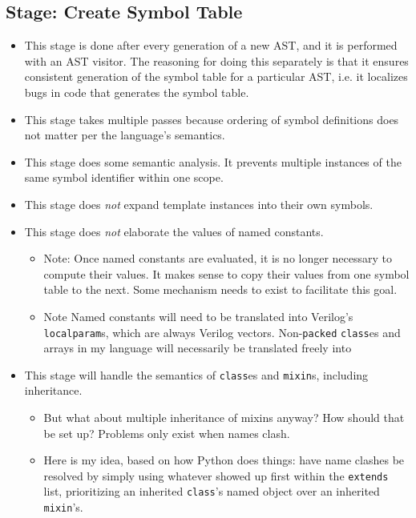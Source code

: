 \documentclass{article}
\begin{document}
	\subsection{Stage:  Create Symbol Table }
		\begin{itemize}
		\item This stage is done after every generation of a new AST, and
			it is performed with an AST visitor.  The reasoning for doing
			this separately is that it ensures consistent generation of the
			symbol table for a particular AST, i.e. it localizes bugs in
			code that generates the symbol table.
		\item This stage takes multiple passes because ordering of symbol
			definitions does not matter per the language's semantics.
		\item This stage does some semantic analysis.  It prevents multiple
			instances of the same symbol identifier within one scope.
		\item This stage does \textit{not} expand template instances into
			their own symbols.
		\item This stage does \textit{not} elaborate the values of named
			constants.
			\begin{itemize}
			\item Note:  Once named constants are evaluated, it is no longer
				necessary to compute their values.  It makes sense to copy
				their values from one symbol table to the next.  Some
				mechanism needs to exist to facilitate this goal.
			\item Note  Named constants will need to be translated into
				Verilog's \texttt{localparam}s, which are always Verilog
				vectors.  Non-\texttt{packed} \texttt{class}es and arrays
				in my language will necessarily be translated freely into
			\end{itemize}
		\item This stage will handle the semantics of \texttt{class}es and
			\texttt{mixin}s, including inheritance.
			\begin{itemize}
			\item But what about multiple inheritance of mixins anyway?
				How should that be set up?  Problems only exist when names
				clash.
			\item Here is my idea, based on how Python does things:  have
				name clashes be resolved by simply using whatever showed up
				first within the \texttt{extends} list, prioritizing an
				inherited \texttt{class}'s named object over an inherited
				\texttt{mixin}'s.
			\end{itemize}
		\end{itemize}
\end{document}
